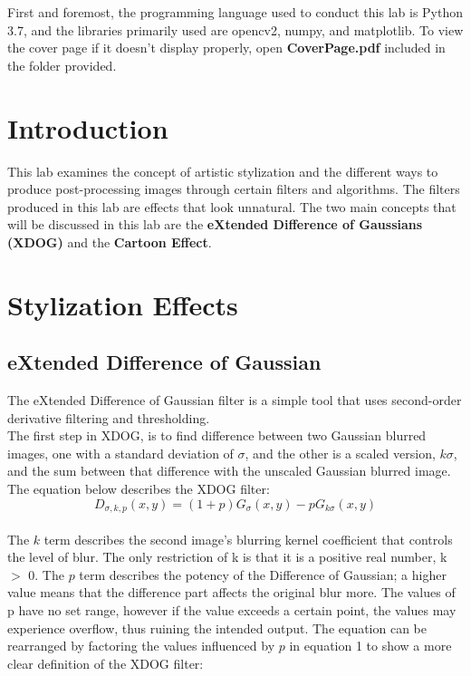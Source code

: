 \documentclass{article}
\begin{document}
	
	
	First and foremost, the programming language used to conduct this lab is Python 3.7, and the libraries primarily used are opencv2, numpy, and matplotlib. To view the cover page if it doesn't display properly, open \textbf{CoverPage.pdf} included in the folder provided.\\
	
	\section{Introduction}
	
	This lab examines the concept of artistic stylization and the different ways to produce post-processing images through certain filters and algorithms. The filters produced in this lab are effects that look unnatural. The two main concepts that will be discussed in this lab are the \textbf{eXtended Difference of Gaussians (XDOG)} and the \textbf{Cartoon Effect}.\\
	
	\section{Stylization Effects}
	
	\subsection{eXtended Difference of Gaussian}
	
	The eXtended Difference of Gaussian filter is a simple tool that uses second-order derivative filtering and thresholding.\\
	
	The first step in XDOG, is to find difference between two Gaussian blurred images, one with a standard deviation of $\sigma$, and the other is a scaled version, $k\sigma$, and the sum between that difference with the unscaled Gaussian blurred image. The equation below describes the XDOG filter:\\
	
	\begin{equation}
	D_{\sigma,k,p}(x,y) = (1 + p)G_{\sigma}(x,y) - pG_{k\sigma}(x,y)
	\end{equation}\\
	
	The $k$ term describes the second image's blurring kernel coefficient that controls the level of blur. The only restriction of k is that it is a positive real number, k $>$ 0. The $p$ term describes the potency of the Difference of Gaussian; a higher value means that the difference part affects the original blur more. The values of p have no set range, however if the value exceeds a certain point, the values may experience overflow, thus ruining the intended output. The equation can be rearranged by factoring the values influenced by $p$ in equation 1 to show a more clear definition of the XDOG filter:\\
	
\end{document}

